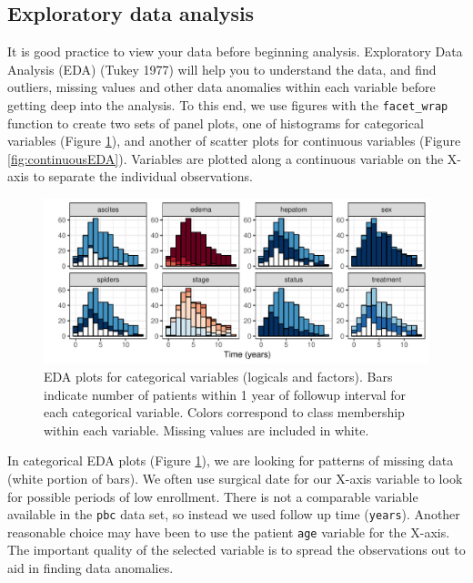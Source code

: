 \documentclass[article, nojss]{jss}
\begin{document}
\subsection{Exploratory data analysis}\label{exploratory-data-analysis}

It is good practice to view your data before beginning analysis.
Exploratory Data Analysis (EDA) (Tukey 1977) will help you to understand
the data, and find outliers, missing values and other data anomalies
within each variable before getting deep into the analysis. To this end,
we use  figures with the \texttt{facet\_wrap} function to
create two sets of panel plots, one of histograms for categorical
variables (Figure \ref{fig:categoricalEDA}), and another of scatter
plots for continuous variables (Figure \ref{fig:continuousEDA}).
Variables are plotted along a continuous variable on the X-axis to
separate the individual observations.

\begin{Schunk}
\begin{figure}[!htb]

{\centering \includegraphics{rfs-categoricalEDA-1}

}

\caption[EDA plots for categorical variables (logicals and factors)]{EDA plots for categorical variables (logicals and factors). Bars indicate number of patients within 1 year of followup interval for each categorical variable. Colors correspond to class membership within each variable. Missing values are included in white.}\label{fig:categoricalEDA}
\end{figure}
\end{Schunk}

In categorical EDA plots (Figure \ref{fig:categoricalEDA}), we are
looking for patterns of missing data (white portion of bars). We often
use surgical date for our X-axis variable to look for possible periods
of low enrollment. There is not a comparable variable available in the
\texttt{pbc} data set, so instead we used follow up time
(\texttt{years}). Another reasonable choice may have been to use the
patient \texttt{age} variable for the X-axis. The important quality of
the selected variable is to spread the observations out to aid in
finding data anomalies.
\end{document}
